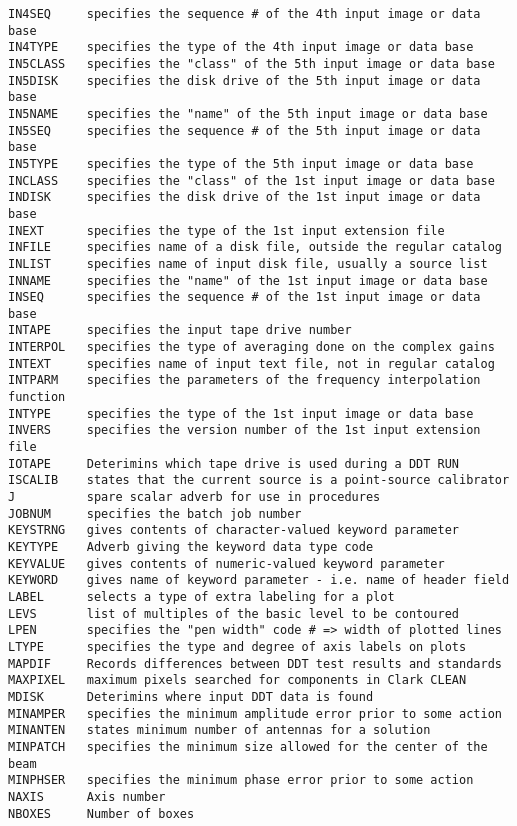 \begin{verbatim}
IN4SEQ     specifies the sequence # of the 4th input image or data base
IN4TYPE    specifies the type of the 4th input image or data base
IN5CLASS   specifies the "class" of the 5th input image or data base
IN5DISK    specifies the disk drive of the 5th input image or data base
IN5NAME    specifies the "name" of the 5th input image or data base
IN5SEQ     specifies the sequence # of the 5th input image or data base
IN5TYPE    specifies the type of the 5th input image or data base
INCLASS    specifies the "class" of the 1st input image or data base
INDISK     specifies the disk drive of the 1st input image or data base
INEXT      specifies the type of the 1st input extension file
INFILE     specifies name of a disk file, outside the regular catalog
INLIST     specifies name of input disk file, usually a source list
INNAME     specifies the "name" of the 1st input image or data base
INSEQ      specifies the sequence # of the 1st input image or data base
INTAPE     specifies the input tape drive number
INTERPOL   specifies the type of averaging done on the complex gains
INTEXT     specifies name of input text file, not in regular catalog
INTPARM    specifies the parameters of the frequency interpolation function
INTYPE     specifies the type of the 1st input image or data base
INVERS     specifies the version number of the 1st input extension file
IOTAPE     Deterimins which tape drive is used during a DDT RUN
ISCALIB    states that the current source is a point-source calibrator
J          spare scalar adverb for use in procedures
JOBNUM     specifies the batch job number
KEYSTRNG   gives contents of character-valued keyword parameter
KEYTYPE    Adverb giving the keyword data type code
KEYVALUE   gives contents of numeric-valued keyword parameter
KEYWORD    gives name of keyword parameter - i.e. name of header field
LABEL      selects a type of extra labeling for a plot
LEVS       list of multiples of the basic level to be contoured
LPEN       specifies the "pen width" code # => width of plotted lines
LTYPE      specifies the type and degree of axis labels on plots
MAPDIF     Records differences between DDT test results and standards
MAXPIXEL   maximum pixels searched for components in Clark CLEAN
MDISK      Deterimins where input DDT data is found
MINAMPER   specifies the minimum amplitude error prior to some action
MINANTEN   states minimum number of antennas for a solution
MINPATCH   specifies the minimum size allowed for the center of the beam
MINPHSER   specifies the minimum phase error prior to some action
NAXIS      Axis number
NBOXES     Number of boxes

\end{verbatim}
